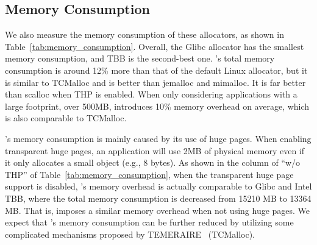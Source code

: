 \subsection{Memory Consumption}
\label{sec:memory}

We also measure the memory consumption of these allocators, as shown in Table~\ref{tab:memory_consumption}.
Overall, the Glibc allocator has the smallest memory consumption, and TBB is the second-best one. \NM{}'s total memory consumption is around 12\% more than that of the default Linux allocator, but it is similar to TCMalloc and is better than jemalloc and mimalloc. It is far better than scalloc when THP is enabled. When only considering applications with a large footprint, over 500MB, \NM{} introduces 10\% memory overhead on average, which is also comparable to TCMalloc.  

\NM{}'s  memory consumption is mainly caused by its use of huge pages. When enabling transparent huge pages, an application will use 2MB of physical memory even if it only allocates a small object (e.g., 8 bytes). As shown in the column of ``w/o THP'' of Table~\ref{tab:memory_consumption}, when the transparent huge page support is disabled, \NM{}'s memory overhead is actually comparable to Glibc and Intel TBB, where the total memory consumption is decreased from 15210 MB to 13364 MB. That is, \NM{} imposes a similar memory overhead when not using huge pages. We expect that \NM{}'s memory consumption can be further reduced by utilizing some complicated mechanisms proposed by TEMERAIRE~\cite{TEMERAIRE} (TCMalloc).   

